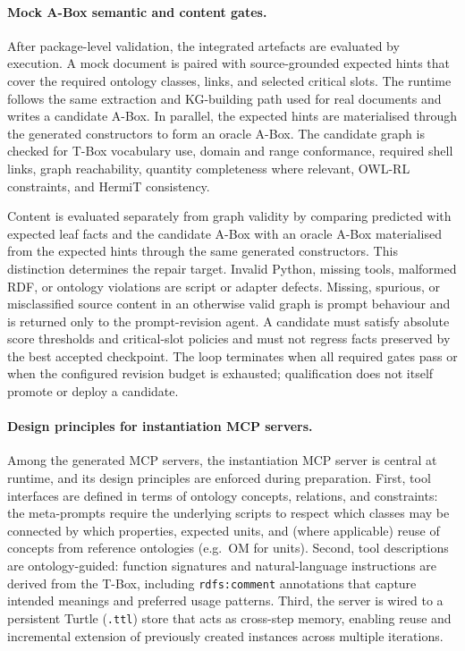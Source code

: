 \paragraph{Mock A-Box semantic and content gates.}
After package-level validation, the integrated artefacts are evaluated by execution. A mock document is paired with source-grounded expected hints that cover the required ontology classes, links, and selected critical slots. The runtime follows the same extraction and KG-building path used for real documents and writes a candidate A-Box. In parallel, the expected hints are materialised through the generated constructors to form an oracle A-Box. The candidate graph is checked for T-Box vocabulary use, domain and range conformance, required shell links, graph reachability, quantity completeness where relevant, OWL-RL constraints, and HermiT consistency.

Content is evaluated separately from graph validity by comparing predicted with expected leaf facts and the candidate A-Box with an oracle A-Box materialised from the expected hints through the same generated constructors. This distinction determines the repair target. Invalid Python, missing tools, malformed RDF, or ontology violations are script or adapter defects. Missing, spurious, or misclassified source content in an otherwise valid graph is prompt behaviour and is returned only to the prompt-revision agent. A candidate must satisfy absolute score thresholds and critical-slot policies and must not regress facts preserved by the best accepted checkpoint. The loop terminates when all required gates pass or when the configured revision budget is exhausted; qualification does not itself promote or deploy a candidate.

\paragraph{Design principles for instantiation MCP servers.}
Among the generated MCP servers, the instantiation MCP server is central at
runtime, and its design principles are enforced during preparation. First, tool
interfaces are defined in terms of ontology concepts, relations, and constraints:
the meta-prompts require the underlying scripts to respect which classes may be
connected by which properties, expected units, and (where applicable) reuse of
concepts from reference ontologies (e.g.\ OM for units). Second, tool
descriptions are ontology-guided: function signatures and natural-language
instructions are derived from the T-Box, including \texttt{rdfs:comment}
annotations that capture intended meanings and preferred usage patterns. Third,
the server is wired to a persistent Turtle (\texttt{.ttl}) store that acts as
cross-step memory, enabling reuse and incremental extension of previously
created instances across multiple iterations.

